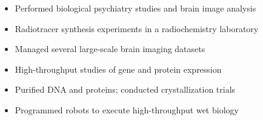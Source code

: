 \documentclass[10pt,a4paper]{altacv}
\begin{document}





\clearpage


\begin{itemize}
\item Performed biological psychiatry studies and brain image analysis
\item Radiotracer synthesis experiments in a radiochemistry laboratory  
\item Managed several large-scale brain imaging datasets
\end{itemize}

\divider



\begin{itemize}
\item High-throughput studies of gene and protein expression
\item Purified DNA and proteins; conducted crystallization trials
\item Programmed robots to execute high-throughput wet biology
\end{itemize}
\end{document}
